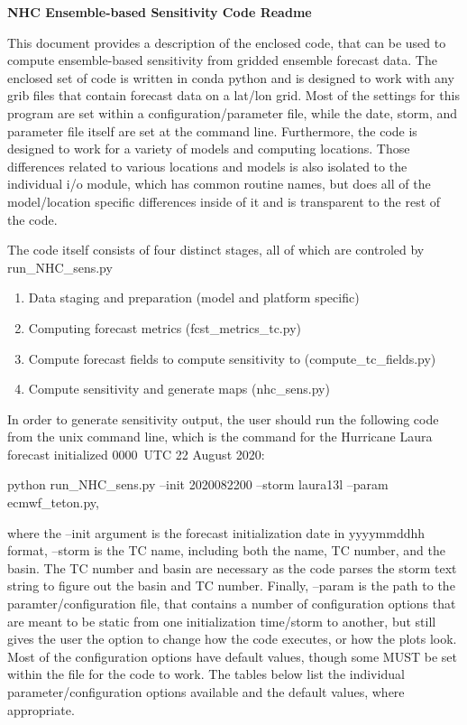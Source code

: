\documentclass[psfig,12pt]{article}
\begin{document}
\pagestyle{empty}

\centering
{\Large\bf NHC Ensemble-based Sensitivity Code Readme}
\flushleft
\vspace{0.3in}

This document provides a description of the enclosed code, that can be used to compute ensemble-based
sensitivity from gridded ensemble forecast data.  The enclosed set of code is written in conda python
and is designed to work with any grib files that contain forecast data on a lat/lon grid.  Most of the
settings for this program are set within a configuration/parameter file, while the date, storm, and
parameter file itself are set at the command line.  Furthermore,
the code is designed to work for a variety of models and computing locations.  Those differences related
to various locations and models is also isolated to the individual i/o module, which has common routine
names, but does all of the model/location specific differences inside of it and is transparent to 
the rest of the code.

The code itself consists of four distinct stages, all of which are controled by run\_NHC\_sens.py

\begin{enumerate}
\item Data staging and preparation (model and platform specific)
\item Computing forecast metrics (fcst\_metrics\_tc.py)
\item Compute forecast fields to compute sensitivity to (compute\_tc\_fields.py)
\item Compute sensitivity and generate maps (nhc\_sens.py)
\end{enumerate}

In order to generate sensitivity output, the user should run the following code from the unix 
command line, which is the command for the Hurricane Laura forecast initialized 0000~UTC 22 August 2020:

\vspace{0.1in}
python run\_NHC\_sens.py --init 2020082200 --storm laura13l --param ecmwf\_teton.py, 
\vspace{0.1in}

where the --init argument is the forecast initialization date in yyyymmddhh format, --storm is the 
TC name, including both the name, TC number, and the basin.  The TC number and basin are necessary 
as the code parses the storm text string to figure out the basin and TC number.  Finally, --param is
the path to the paramter/configuration file, that contains a number of configuration options that are
meant to be static from one initialization time/storm to another, but still gives the user the option
to change how the code executes, or how the plots look.  Most of the configuration options have 
default values, though some MUST be set within the file for the code to work.  The tables below list 
the individual parameter/configuration options available and the default values, where appropriate.
\end{document}
